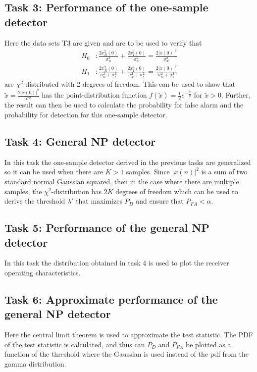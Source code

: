 \subsection{Task 3: Performance of the one-sample detector}
Here the data sets T3 are given and are to be used to verify that
\begin{align}
	H_0 &: \frac{2x_R^2(0)}{\sigma_w^2}+\frac{2x_I^2(0)}{\sigma_w^2}=\frac{2|x(0)|^2}{\sigma_w^2}\label{eq:chi_sq_h0}\\
	H_1 &: \frac{2x_R^2(0)}{\sigma_w^2+\sigma_s^2}+\frac{2x_I^2(0)}{\sigma_w^2+\sigma_s^2}=\frac{2|x(0)|^2}{\sigma_w^2+\sigma_s^2}\label{eq:chi_sq_h1}
\end{align}
are $\chi^2$-distributed with 2 degrees of freedom. This can be used to show that $\widetilde{x} = \frac{2|x(0)|^2}{\sigma^2}$ has the point-distribution function $f(\widetilde{x}) = \frac{1}{2}e^{-\frac{\widetilde{x}}{2}}$ for $\widetilde{x}>0$. Further, the result can then be used to calculate the probability for false alarm and the probability for detection for this one-sample detector.

\subsection{Task 4: General NP detector}
In this task the one-sample detector derived in the previous tasks are generalized so it can be used when there are $K>1$ samples. Since $|x(n)|^2$ is a sum of two standard normal Gaussian squared, then in the case where there are multiple samples, the $\chi^2$-distribution has $2K$ degrees of freedom which can be used to derive the threshold $\lambda'$ that maximizes $P_D$ and ensure that $P_{FA}<\alpha$.

\subsection{Task 5: Performance of the general NP detector}
In this task the distribution obtained in task 4 is used to plot the receiver operating characteristics.

\subsection{Task 6: Approximate performance of the general NP detector}
Here the central limit theorem is used to approximate the test statistic. The PDF of the test statistic is calculated, and thus can $P_D$ and $P_{FA}$ be plotted as a function of the threshold where the Gaussian is used instead of the pdf from the gamma distribution.

